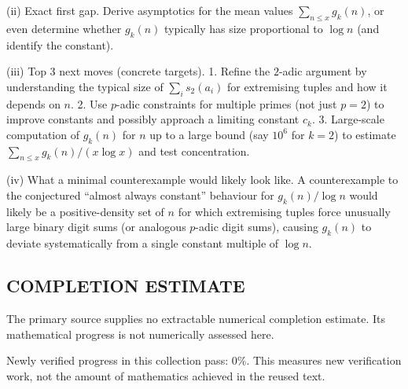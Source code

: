 (ii) Exact first gap.
Derive asymptotics for the mean values $\sum_{n\le x} g_k(n)$, or even determine whether $g_k(n)$ typically has size proportional to $\log n$ (and identify the constant).

(iii) Top 3 next moves (concrete targets).
1. Refine the $2$-adic argument by understanding the typical size of $\sum_i s_2(a_i)$ for extremising tuples and how it depends on $n$.
2. Use $p$-adic constraints for multiple primes (not just $p=2$) to improve constants and possibly approach a limiting constant $c_k$.
3. Large-scale computation of $g_k(n)$ for $n$ up to a large bound (say $10^6$ for $k=2$) to estimate $\sum_{n\le x} g_k(n)/(x\log x)$ and test concentration.

(iv) What a minimal counterexample would likely look like.
A counterexample to the conjectured “almost always constant” behaviour for $g_k(n)/\log n$ would likely be a positive-density set of $n$ for which extremising tuples force unusually large binary digit sums (or analogous $p$-adic digit sums), causing $g_k(n)$ to deviate systematically from a single constant multiple of $\log n$.




\subsection*{COMPLETION ESTIMATE}
The primary source supplies no extractable numerical completion estimate. Its mathematical progress is not numerically assessed here.

Newly verified progress in this collection pass: $0\%$. This measures new verification work, not the amount of mathematics achieved in the reused text.
